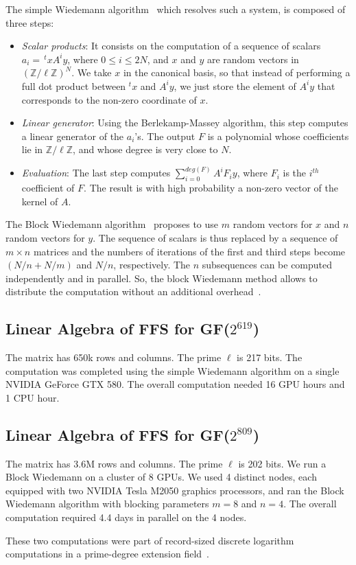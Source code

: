 \documentclass[runningheads,orivec]{llncs}
\begin{document}
The simple Wiedemann algorithm~\cite{WIED86} which resolves such a system, is composed of three steps: 
\begin{itemize}
\item \textit{Scalar products}: It consists on the computation of a sequence of scalars $a_i = \,^txA^i y$, where $0 \leq i \leq 2N$, and $x$ and $y$ are random vectors in $(\mathbb{Z}/\ell\mathbb{Z})^N$. We take $x$ in the canonical basis, so that instead of performing a full dot product between $^tx$ and $A^i y$, we just store the element of $A^i y$ that corresponds to the  non-zero coordinate of $x$.
\item \textit{Linear generator}: Using the Berlekamp-Massey algorithm, this step computes a linear generator of the $a_i$'s. The output $F$ is a polynomial whose coefficients lie in $\mathbb{Z}/\ell\mathbb{Z}$, and whose degree is very close to $N$. 
\item \textit{Evaluation}: The last step computes $\sum_{i=0}^{deg(F)}{A^iF_iy}$, where $F_i$ is the $i^{th}$ coefficient of $F$. The result is with high probability a non-zero vector of the kernel of $A$.
\end{itemize} 

The Block Wiedemann algorithm~\cite{KALT95} proposes to use $m$ random vectors for $x$ and $n$ random vectors for $y$. The sequence of scalars is thus replaced by a sequence of $m \times n$ matrices and the numbers of iterations of the first and third steps become $(N/n + N/m)$ and $N/n$, respectively. The $n$ subsequences can be computed independently and in parallel. So, the block Wiedemann method allows to distribute the computation without an additional overhead~\cite{THOM02}. 

\subsection{Linear Algebra of FFS for GF($2^{619}$)}
The matrix has 650k rows and columns. The prime $\ell$ is 217 bits.
The computation was completed using the simple Wiedemann algorithm on a single NVIDIA GeForce GTX 580. The overall computation needed 16 GPU hours and 1 CPU hour. 

\subsection{Linear Algebra of FFS for GF($2^{809}$)}
The matrix has 3.6M rows and columns. The prime $\ell$ is 202 bits.
We run a Block Wiedemann on a cluster of 8 GPUs. We used 4 distinct nodes, each equipped with two NVIDIA Tesla M2050 graphics processors, and ran the Block Wiedemann algorithm with blocking parameters $m=8$ and $n=4$. The overall computation required 4.4 days in parallel on the 4 nodes.

\medskip 
These two computations were part of record-sized discrete logarithm computations in a prime-degree extension field~\cite{FFS809,JEL14}.
\end{document}
